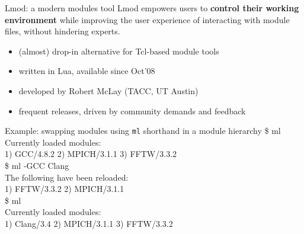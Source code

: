 \documentclass[10pt,xcolor={usenames,dvipsnames}]{beamer}
\begin{document}
\begin{frame}{Lmod: a modern modules tool}
    Lmod empowers users to \textbf{control their working environment} while improving the user
    experience of interacting with module files, without hindering experts.
    \begin{itemize}
        \item \small{(almost)} drop-in alternative for Tcl-based module tools
        \item written in Lua, available since Oct'08
        \item developed by Robert McLay (TACC, UT Austin)
        \item frequent releases, driven by community demands and feedback
    \end{itemize}
    \begin{minipage}{0.9\textwidth}
    \begin{exampleblock}{Example: swapping modules using \texttt{ml} shorthand in a module hierarchy}
        \ttfamily\footnotesize{
        \$ ml\\
        Currently loaded modules:\\
        1) GCC/4.8.2 2) MPICH/3.1.1 3) FFTW/3.3.2\\
        \$ ml -GCC Clang\\
        The following have been reloaded:\\
        1) FFTW/3.3.2 2) MPICH/3.1.1\\
        \$ ml\\
        Currently loaded modules:\\
        1) Clang/3.4 2) MPICH/3.1.1 3) FFTW/3.3.2}
    \end{exampleblock}
    \end{minipage}
\end{frame}

\end{document}
